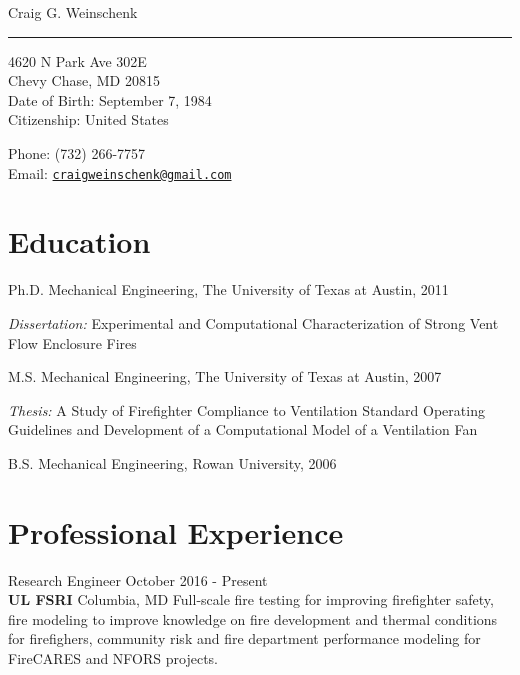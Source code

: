 \documentclass[10pt,letterpaper]{article}
\def\name{Craig G. Weinschenk}
\renewenvironment{itemize}{
  \begin{list}{}{
    \setlength{\leftmargin}{1.5em}
  }
}{
  \end{list}
}
\begin{document}
{\huge \name} \\
\noindent\rule{17cm}{0.4pt}


\vspace{0.25in}

\begin{minipage}[t]{0.5\textwidth}
  4620 N Park Ave 302E \\
  Chevy Chase, MD  20815\\
  Date of Birth: September 7, 1984 \\
  Citizenship: United States
\end{minipage}
\begin{minipage}[t]{0.5\textwidth}
  Phone: (732) 266-7757 \\
  Email: \href{mailto:craigweinschenk@gmail.com} {\tt craigweinschenk@gmail.com}\\

\end{minipage}

\section*{Education}

\begin{itemize}
  \item Ph.D. Mechanical Engineering, The University of Texas at Austin, 2011
    \begin{itemize}
      \item \textit{Dissertation:} Experimental and Computational Characterization of Strong Vent Flow Enclosure Fires
    \end{itemize}

  \item M.S. Mechanical Engineering, The University of Texas at Austin, 2007
    \begin{itemize}
      \item \textit{Thesis:} A Study of Firefighter Compliance to Ventilation Standard Operating Guidelines and Development of a Computational Model of a Ventilation Fan
    \end{itemize}

  \item B.S. Mechanical Engineering, Rowan University, 2006
\end{itemize}

\section*{Professional Experience}
Research Engineer \hfill October 2016 - Present \\
{\bf UL FSRI} \hfill Columbia, MD \vskip3pt
Full-scale fire testing for improving firefighter safety, fire modeling to improve knowledge on fire development and thermal conditions for firefighers, community risk and fire department performance modeling for FireCARES and NFORS projects. \\
\end{document}

